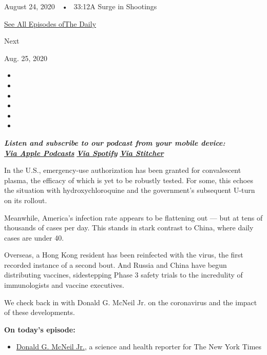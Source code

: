 August 24, 2020~~•~ 33:12A Surge in Shootings

\href{https://www.nytimes3xbfgragh.onion/column/the-daily}{See All
Episodes ofThe Daily}

Next

Aug. 25, 2020

\begin{itemize}
\item
\item
\item
\item
\item
\item
\end{itemize}

\emph{\textbf{Listen and subscribe to our podcast from your mobile
device:}}\\
\textbf{\href{https://itunes.apple.com/us/podcast/the-daily/id1200361736?mt=2}{\emph{Via
Apple Podcasts}}} \emph{\textbf{\textbar{}}}
\textbf{\href{https://open.spotify.com/show/3IM0lmZxpFAY7CwMuv9H4g?si=SfuMSC55R1qprFsRZU3_zw}{\emph{Via
Spotify}}} \emph{\textbf{\textbar{}}}
\textbf{\href{http://www.stitcher.com/podcast/the-new-york-times/the-daily-10}{\emph{Via
Stitcher}}}

In the U.S., emergency-use authorization has been granted for
convalescent plasma, the efficacy of which is yet to be robustly tested.
For some, this echoes the situation with hydroxychloroquine and the
government's subsequent U-turn on its rollout.

Meanwhile, America's infection rate appears to be flattening out --- but
at tens of thousands of cases per day. This stands in stark contrast to
China, where daily cases are under 40.

Overseas, a Hong Kong resident has been reinfected with the virus, the
first recorded instance of a second bout. And Russia and China have
begun distributing vaccines, sidestepping Phase 3 safety trials to the
incredulity of immunologists and vaccine executives.

We check back in with Donald G. McNeil Jr. on the coronavirus and the
impact of these developments.

\textbf{On today's episode:}

\begin{itemize}
\tightlist
\item
  \href{https://www.nytimes3xbfgragh.onion/by/donald-g-mcneil-jr}{Donald
  G. McNeil Jr.}, a science and health reporter for The New York Times
\end{itemize}

